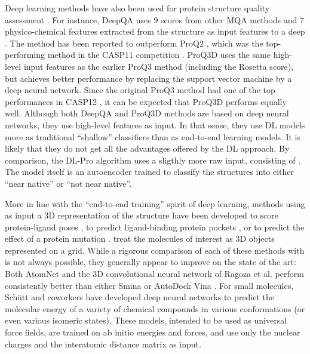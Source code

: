 Deep learning methods have also been used for protein structure
quality assessment \cite{nguyen2014dlpro, cao2016deepqa,
uziela2017proq3d}. For instance, DeepQA \cite{cao2016deepqa} uses 9
scores from other MQA methods and 7 physico-chemical features
extracted from the structure as input features to a deep . The method has been reported \cite{cao2016deepqa} to
outperform ProQ2 \cite{ray2012proq2}, which was the top-performing
method in the CASP11 competition \cite{kryshtafovych2015}.
ProQ3D \cite{uziela2017proq3d} uses the same high-level input features
as the earlier ProQ3 method \cite{uziela2016proq3} (including the
Rosetta \cite{leaverfay2011rosetta} score), but achieves better
performance by replacing the support vector machine by a deep neural
network. Since the original ProQ3 method had one of the top
performances in CASP12 \cite{elofsson2017qacasp12}, it can be expected
that ProQ3D performs equally well. Although both DeepQA and ProQ3D
methods are based on deep neural networks, they use high-level
features as input. In that sense, they use DL models more as
traditional ``shallow'' classifiers than as end-to-end learning
models. It is likely that they do not get all the advantages offered
by the DL approach.
%
By comparison, the DL-Pro algorithm \cite{nguyen2014dlpro} uses a
sligthly more raw input, consisting of . The model itself is an autoencoder  trained to classify
the structures into either ``near native'' or ``not near native''.

More in line with the ``end-to-end training'' spirit of deep learning,
methods using as input a 3D representation of the structure have been
developed to score protein-ligand poses \cite{wallach2015atomnet,
ragoza2017protein}, to predict ligand-binding protein
pockets \cite{jimenez2017deepsite}, or to predict the effect of a
protein mutation \cite{torng2017}.  treat the molecules of interest as 3D
objects represented on a grid. While a rigorous comparison of each of
these methods with is not always possible, they generally appear to
improve on the state of the art: Both
AtomNet \cite{wallach2015atomnet} and the 3D convolutional neural
network of Ragoza et al. \cite{ragoza2017protein} perform
consistently better than either Smina \cite{koes2013smina} or AutoDock
Vina \cite{trott2009vina}.
%
For small molecules, Sch\"{u}tt and coworkers \cite{schutt2017quantum,
schutt2017moleculenet} have developed deep neural networks to predict
the molecular energy of a variety of chemical compounds in various
conformations (or even various isomeric states). These models,
intended to be used as universal force fields, are trained on ab
initio energies and forces, and use only the nuclear charges and the
interatomic distance matrix as input.
